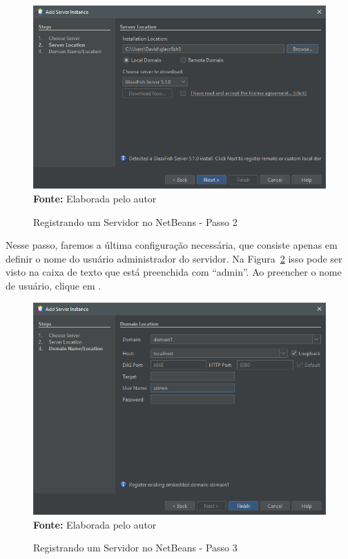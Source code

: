 \FloatBarrier
\begin{figure}[!htbp]
    \centering
    \caption{Registrando um Servidor no NetBeans - Passo 2}
    \includegraphics[scale=0.7]{imagens/cap01AddServerInstanceP02}
    \\\textbf{Fonte:} Elaborada pelo autor
    \label{fig:cap01AddServerP02}
\end{figure}
\FloatBarrier

Nesse passo, faremos a última configuração necessária, que consiste apenas em definir o nome do usuário administrador do servidor. Na Figura~\ref{fig:cap01AddServerP03} isso pode ser visto na caixa de texto  que está preenchida com ``admin''. Ao preencher o nome de usuário, clique em .

\FloatBarrier
\begin{figure}[!htbp]
    \centering
    \caption{Registrando um Servidor no NetBeans - Passo 3}
    \includegraphics[scale=0.7]{imagens/cap01AddServerInstanceP03}
    \\\textbf{Fonte:} Elaborada pelo autor
    \label{fig:cap01AddServerP03}
\end{figure}
\FloatBarrier

